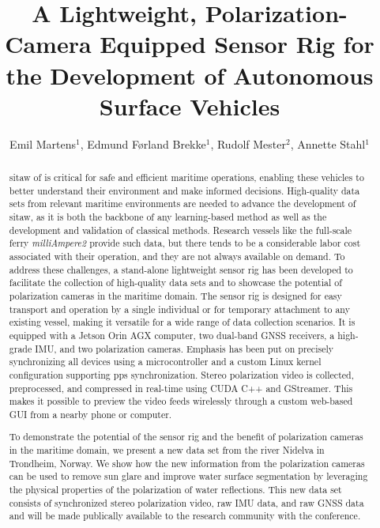 \documentclass{iopconfser}
\begin{document}
\title{A Lightweight, Polarization-Camera Equipped Sensor Rig for the Development of Autonomous Surface Vehicles}

\author{Emil Martens$^{1}$, Edmund Førland Brekke$^{1}$, Rudolf Mester$^{2}$, Annette Stahl$^{1}$}




\begin{abstract}
    \justifying 
    \gls{sitaw} of  is critical for safe and efficient maritime operations, enabling these vehicles to better understand their environment and make informed decisions.
    High-quality data sets from relevant maritime environments are needed to advance the development of \gls{sitaw}, as it is both the backbone of any learning-based method as well as the development and validation of classical methods.
    Research vessels like the full-scale ferry \textit{milliAmpere2} provide such data, but there tends to be a considerable labor cost associated with their operation, and they are not always available on demand.
    To address these challenges, a stand-alone lightweight sensor rig has been developed to facilitate the collection of high-quality data sets and to showcase the potential of polarization cameras in the maritime domain.
    The sensor rig is designed for easy transport and operation by a single individual or for temporary attachment to any existing vessel, making it versatile for a wide range of data collection scenarios.
    It is equipped with a Jetson Orin AGX computer, two dual-band GNSS receivers, a high-grade IMU, and two polarization cameras.
    Emphasis has been put on precisely synchronizing all devices using a microcontroller and a custom Linux kernel configuration supporting \gls{pps} synchronization.
    Stereo polarization video is collected, preprocessed, and compressed in real-time using CUDA C++ and GStreamer. This makes it possible to preview the video feeds wirelessly through a custom web-based GUI from a nearby phone or computer.
    
    To demonstrate the potential of the sensor rig and the benefit of polarization cameras in the maritime domain, we present a new data set from the river Nidelva in Trondheim, Norway. 
    We show how the new information from the polarization cameras can be used to remove sun glare and improve water surface segmentation by leveraging the physical properties of the polarization of water reflections.
    This new data set consists of synchronized stereo polarization video, raw IMU data, and raw GNSS data and will be made publically available to the research community with the conference.
    
    
\end{abstract}
\end{document}
